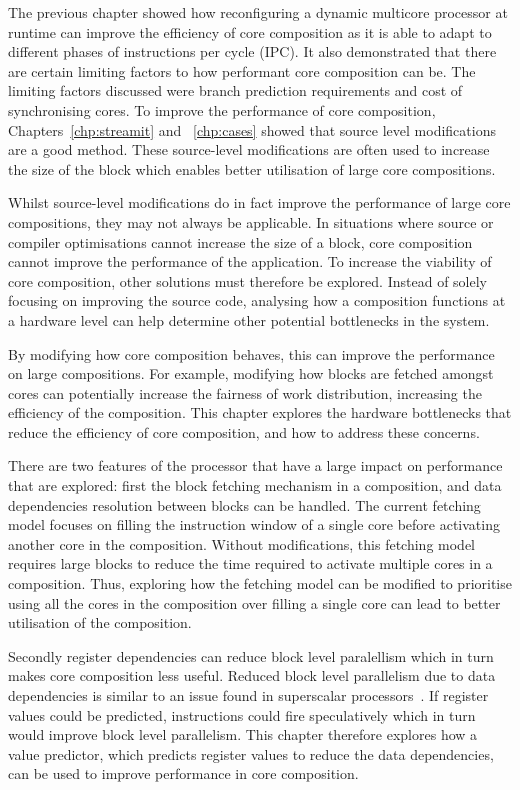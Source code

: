 The previous chapter showed how reconfiguring a dynamic multicore processor at runtime can improve the efficiency of core composition as it is able to adapt to different phases of instructions per cycle (IPC).
It also demonstrated that there are certain limiting factors to how performant core composition can be.
The limiting factors discussed were branch prediction requirements and cost of synchronising cores.
To improve the performance of core composition, Chapters~\ref{chp:streamit} and ~\ref{chp:cases} showed that source level modifications are a good method.
These source-level modifications are often used to increase the size of the block which enables better utilisation of large core compositions.

Whilst source-level modifications do in fact improve the performance of large core compositions, they may not always be applicable.
In situations where source or compiler optimisations cannot increase the size of a block, core composition cannot improve the performance of the application.
To increase the viability of core composition, other solutions must therefore be explored.
Instead of solely focusing on improving the source code, analysing how a composition functions at a hardware level can help determine other potential bottlenecks in the system.

By modifying how core composition behaves, this can improve the performance on large compositions.
For example, modifying how blocks are fetched amongst cores can potentially increase the fairness of work distribution, increasing the efficiency of the composition.
This chapter explores the hardware bottlenecks that reduce the efficiency of core composition, and how to address these concerns.

There are two features of the processor that have a large impact on performance that are explored: first the block fetching mechanism in a composition, and data dependencies resolution between blocks can be handled.
The current fetching model focuses on filling the instruction window of a single core before activating another core in the composition.
Without modifications, this fetching model requires large blocks to reduce the time required to activate multiple cores in a composition.
Thus, exploring how the fetching model can be modified to prioritise using all the cores in the composition over filling a single core can lead to better utilisation of the composition.

Secondly register dependencies can reduce block level paralellism which in turn makes core composition less useful.
Reduced block level parallelism due to data dependencies is similar to an issue found in superscalar processors~\cite{peraisBeBop2015}.
If register values could be predicted, instructions could fire speculatively which in turn would improve block level parallelism.
This chapter therefore explores how a value predictor, which predicts register values to reduce the data dependencies, can be used to improve performance in core composition.

